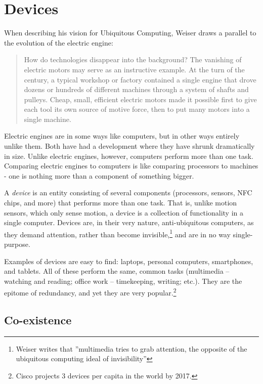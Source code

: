 \section{Devices}
\label{sec:devices}

When describing his vision for Ubiquitous Computing, Weiser draws a parallel to the evolution of the electric engine:

\begin{quote}
    How do technologies disappear into the background? The vanishing of electric motors may serve as an instructive example.
    At the turn of the century, a typical workshop or factory contained a single engine that drove dozens or hundreds of
    different machines through a system of shafts and pulleys. Cheap, small, efficient electric motors made it possible first
    to give each tool its own source of motive force, then to put many motors into a single machine.\cite{weiser91}
\end{quote}

Electric engines are in some ways like computers, but in other ways entirely unlike them. Both have had a development where
they have shrunk dramatically in size. Unlike electric engines, however, computers perform more than one task. Comparing electric
engines to computers is like comparing processors to machines - one is nothing more than a component of something bigger.

A \emph{device} is an entity consisting of several components (processors, sensors, NFC chips, and more) that performs more
than one task. That is, unlike motion sensors, which only sense motion, a device is a collection of functionality in a single
computer. Devices are, in their very nature, anti-ubiquitous computers, as they demand attention, rather than become
invisible,\footnote{Weiser writes that ''multimedia tries to grab attention, the opposite of the ubiquitous computing ideal of
invisibility''\cite{weiser93}} and are in no way single-purpose.

Examples of devices are easy to find: laptops, personal computers, smartphones, and tablets. All of these perform the same, common
tasks (multimedia -- watching and reading; office work -- timekeeping, writing; etc.). They are the epitome of redundancy, and yet
they are very popular.\footnote{Cisco projects 3 devices per capita in the world by 2017.\cite{cisco}}

\subsection*{Co-existence}

